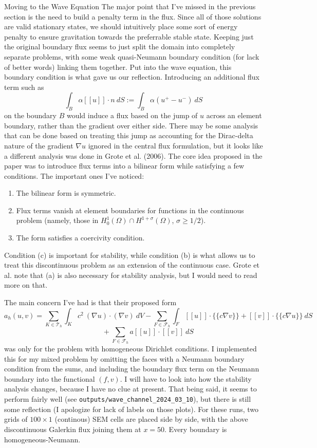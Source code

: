 \documentclass[12pt, letterpaper]{article}
\begin{document}
\begin{section}{Moving to the Wave Equation}
The major point that I've missed in the previous section is the need to build a penalty term in the flux. Since all of those solutions are valid stationary states, we should intuitively place some sort of energy penalty to ensure gravitation towards the preferrable stable state. Keeping just the original boundary flux seems to just split the domain into completely separate problems, with some weak quasi-Neumann boundary condition (for lack of better words) linking them together. Put into the wave equation, this boundary condition is what gave us our reflection. Introducing an additional flux term such as
$$\int_{B}\alpha [[u]]\cdot n~dS := \int_{B}\alpha (u^+ - u^-)~dS$$
on the boundary $B$ would induce a flux based on the jump of $u$ across an element boundary, rather than the gradient over either side. There may be some analysis that can be done based on treating this jump as accounting for the Dirac-delta nature of the gradient $\nabla u$ ignored in the central flux formulation, but it looks like a different analysis was done in Grote et al. (2006). The core idea proposed in the paper was to introduce flux terms into a bilinear form while satisfying a few conditions. The important ones I've noticed:
\begin{enumerate}[label=(\alph*)]
	\item The bilinear form is symmetric.
	\item Flux terms vanish at element boundaries for functions in the continuous problem (namely, those in $H_0^1(\Omega) \cap H^{1+\sigma}(\Omega)$, $\sigma \ge 1/2$).
	\item The form satisfies a coercivity condition.
\end{enumerate}
Condition (c) is important for stability, while condition (b) is what allows us to treat this discontinuous problem as an extension of the continuous case. Grote et al. note that (a) is also necessary for stability analysis, but I would need to read more on that.

The main concern I've had is that their proposed form
$$a_h(u,v) = \sum_{K\in \mathcal T_h}\int_K c^2~(\nabla u)\cdot(\nabla v)~dV - \sum_{F\in \mathcal F_h}\int_{F}[[u]]\cdot \{\{c\nabla v\}\} + [[v]]\cdot \{\{c\nabla u\}\}~dS$$$$~~~~~~~~~~~~~~~~~~ + \sum_{F\in \mathcal F_h}a [[u]] \cdot [[v]]~dS$$
was only for the problem with homogeneous Dirichlet conditions. I implemented this for my mixed problem by omitting the faces with a Neumann boundary condition from the sums, and including the boundary flux term on the Neumann boundary into the functional $(f,v)$. I will have to look into how the stability analysis changes, because I have no clue at present. That being said, it seems to perform fairly well (see \verb+outputs/wave_channel_2024_03_10+), but there is still some reflection (I apologize for lack of labels on those plots). For these runs, two grids of $100 \times 1$ (continous) SEM cells are placed side by side, with the above discontinuous Galerkin flux joining them at $x=50$. Every boundary is homogeneous-Neumann.


\end{section}
\end{document}
